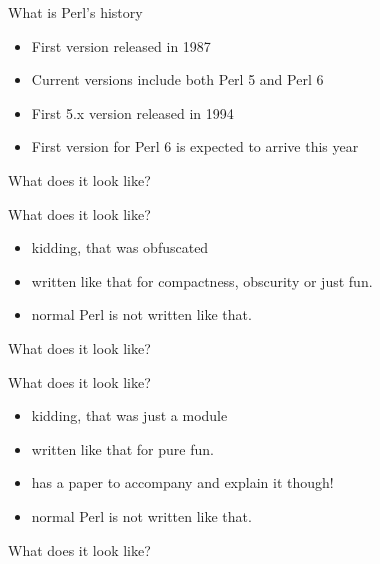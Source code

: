 \documentclass{beamer}
\begin{document}
    \begin{frame}{What is Perl's history}
        \begin{itemize}
            \item First version released in 1987
            \item Current versions include both Perl 5 and Perl 6
            \item First 5.x version released in 1994
            \item First version for Perl 6 is expected to arrive this year
        \end{itemize}
    \end{frame}

    \begin{frame}{What does it look like?}
        
    \end{frame}

    \begin{frame}{What does it look like?}
        \begin{itemize}
            \item kidding, that was obfuscated
            \item written like that for compactness, obscurity or just fun.
            \item normal Perl is not written like that.
        \end{itemize}
    \end{frame}

    \begin{frame}{What does it look like?}
        \small
        
    \end{frame}

    \begin{frame}{What does it look like?}
        \begin{itemize}
            \item kidding, that was just a module
            \item written like that for pure fun.
            \item has a paper to accompany and explain it though!
            \item normal Perl is not written like that.
        \end{itemize}
    \end{frame}

    \begin{frame}{What does it look like?}
       \tiny
       
    \end{frame}
\end{document}
